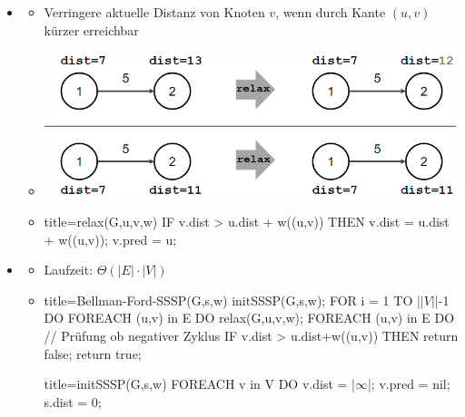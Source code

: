 \documentclass[
    12pt,
    a4paper,
    ngerman,
    color=3b,%
    marginpar=false,
    colorback=false,
    leqno,
]{tudaexercise}
\begin{document}
\begin{itemize}
        \item {}
            \begin{itemize}
                \item Verringere aktuelle Distanz von Knoten $v$, wenn durch Kante $(u,v)$ kürzer erreichbar
                \item[] \includegraphics[width=12cm]{pictures/ssspRelax.PNG}
                \item[]
                    \begin{ccode}[autogobble]{title={relax(G,u,v,w)}}
                    IF v.dist > u.dist + w((u,v)) THEN
                        v.dist = u.dist + w((u,v));
                        v.pred = u;
                    \end{ccode}
            \end{itemize}
\clearpage
        \item {}
            \begin{itemize}
                \item Laufzeit: $\Theta(|E| \cdot |V|)$
                \item[]
                    \begin{ccode}[autogobble,escapeinside=||]{title={Bellman-Ford-SSSP(G,s,w)}}
                    initSSSP(G,s,w);
                    FOR i = 1 TO |$\vert V\vert$|-1 DO
                        FOREACH (u,v) in E DO
                            relax(G,u,v,w);
                    FOREACH (u,v) in E DO   // Prüfung ob negativer Zyklus
                        IF v.dist > u.dist+w((u,v)) THEN
                            return false;
                    return true;
                    \end{ccode}
                    \begin{ccode}[autogobble,escapeinside=||]{title={initSSSP(G,s,w)}}
                    FOREACH v in V DO
                        v.dist = |$\infty$|;
                        v.pred = nil;
                    s.dist = 0;
                    \end{ccode}
            \end{itemize}


\end{itemize}
\end{document}
